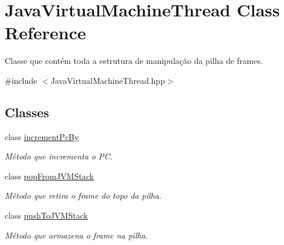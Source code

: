 \hypertarget{classJavaVirtualMachineThread}{}\section{Java\+Virtual\+Machine\+Thread Class Reference}
\label{classJavaVirtualMachineThread}


Classe que contém toda a estrutura de manipulação da pilha de frames.  




{\ttfamily \#include $<$Java\+Virtual\+Machine\+Thread.\+hpp$>$}

\subsection*{Classes}
\begin{DoxyCompactItemize}
\item 
class \hyperlink{classJavaVirtualMachineThread_1_1incrementPcBy}{increment\+Pc\+By}
\begin{DoxyCompactList}\small\item\em Método que incrementa o PC. \end{DoxyCompactList}\item 
class \hyperlink{classJavaVirtualMachineThread_1_1popFromJVMStack}{pop\+From\+J\+V\+M\+Stack}
\begin{DoxyCompactList}\small\item\em Método que retira o frame do topo da pilha. \end{DoxyCompactList}\item 
class \hyperlink{classJavaVirtualMachineThread_1_1pushToJVMStack}{push\+To\+J\+V\+M\+Stack}
\begin{DoxyCompactList}\small\item\em Método que armazena o frame na pilha. \end{DoxyCompactList}\end{DoxyCompactItemize}
